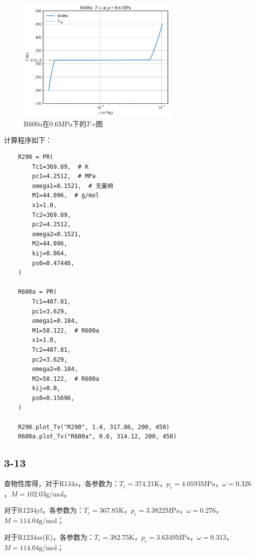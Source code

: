 \documentclass[12pt,a4paper]{article}
\begin{document}
\begin{figure}[H]
    \centering
    \includegraphics[width=0.7\textwidth]{R600a.png}
    \caption{R600a在0.6MPa下的$T$-$v$图}
\end{figure}

计算程序如下：

\begin{lstlisting}
    R290 = PR(
        Tc1=369.89,  # K
        pc1=4.2512,  # MPa
        omega1=0.1521,  # 无量纲
        M1=44.096,  # g/mol
        x1=1.0,
        Tc2=369.89,
        pc2=4.2512,
        omega2=0.1521,
        M2=44.096,
        kij=0.064,
        ps0=0.47446,
    )

    R600a = PR(
        Tc1=407.81,
        pc1=3.629,
        omega1=0.184,
        M1=58.122,  # R600a
        x1=1.0,
        Tc2=407.81,
        pc2=3.629,
        omega2=0.184,
        M2=58.122,  # R600a
        kij=0.0,
        ps0=0.15696,
    )

    R290.plot_Tv("R290", 1.4, 317.86, 200, 450)
    R600a.plot_Tv("R600a", 0.6, 314.12, 200, 450)
\end{lstlisting}


\subsection*{3-13}
查物性库得，对于R134a，各参数为：$T_\mathrm{c}=374.21\mathrm{K}$，$p_\mathrm{c}=4.0593\mathrm{MPa}$，$\omega=0.326$，$M=102.03\mathrm{g/mol}$。

对于R1234yf，各参数为：$T_\mathrm{c}=367.85\mathrm{K}$，$p_\mathrm{c}=3.3822\mathrm{MPa}$，$\omega=0.276$，$M=114.04\mathrm{g/mol}$；

对于R1234ze(E)，各参数为：$T_\mathrm{c}=382.75\mathrm{K}$，$p_\mathrm{c}=3.6349\mathrm{MPa}$，$\omega=0.313$，$M=114.04\mathrm{g/mol}$；
\end{document}
